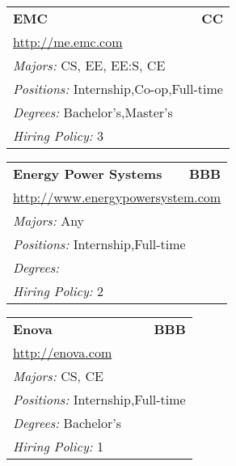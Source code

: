 \documentclass[twoside]{article}
\begin{document}
\begin{center}
\begin{multicols}{3}
\begin{FlushLeft}
\begin{minipage}{\columnwidth}
\end{minipage}
 
\begin{minipage}{\columnwidth}\begin{tabularx}{.95\columnwidth}{Xr}
                 {\Large\bf EMC} & {\Large\bf CC}\\
    \multicolumn{2}{p{.95\columnwidth}}{\url{http://me.emc.com}}\\
    \multicolumn{2}{p{.95\columnwidth}}{\emph{Majors:} CS, EE, EE:S, CE}\\
    \multicolumn{2}{p{.95\columnwidth}}{\emph{Positions:} Internship,Co-op,Full-time}\\
    \multicolumn{2}{p{.95\columnwidth}}{\emph{Degrees:} Bachelor's,Master's}\\
    \multicolumn{2}{p{.95\columnwidth}}{\emph{Hiring Policy:} 3}\\
    \end{tabularx}
    
\end{minipage}
 
\begin{minipage}{\columnwidth}\begin{tabularx}{.95\columnwidth}{Xr}
                 {\Large\bf Energy Power Systems} & {\Large\bf BBB}\\
    \multicolumn{2}{p{.95\columnwidth}}{\url{http://www.energypowersystem.com}}\\
    \multicolumn{2}{p{.95\columnwidth}}{\emph{Majors:} Any}\\
    \multicolumn{2}{p{.95\columnwidth}}{\emph{Positions:} Internship,Full-time}\\
    \multicolumn{2}{p{.95\columnwidth}}{\emph{Degrees:} }\\
    \multicolumn{2}{p{.95\columnwidth}}{\emph{Hiring Policy:} 2}\\
    \end{tabularx}
    
\end{minipage}
 
\begin{minipage}{\columnwidth}\begin{tabularx}{.95\columnwidth}{Xr}
                 {\Large\bf Enova} & {\Large\bf BBB}\\
    \multicolumn{2}{p{.95\columnwidth}}{\url{http://enova.com}}\\
    \multicolumn{2}{p{.95\columnwidth}}{\emph{Majors:} CS, CE}\\
    \multicolumn{2}{p{.95\columnwidth}}{\emph{Positions:} Internship,Full-time}\\
    \multicolumn{2}{p{.95\columnwidth}}{\emph{Degrees:} Bachelor's}\\
    \multicolumn{2}{p{.95\columnwidth}}{\emph{Hiring Policy:} 1}\\
    \end{tabularx}
    

\end{minipage}
\end{FlushLeft}
\end{multicols}
\end{center}
\end{document}
